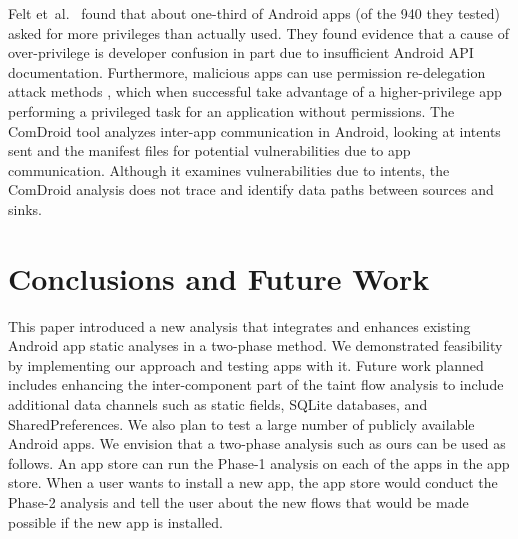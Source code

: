 {Felt et\ al.~\cite{felt2011android} found that about one-third of Android apps (of the 940 they tested) asked for more privileges than actually used. They found evidence that a cause of over-privilege is developer confusion in part due to insufficient Android API documentation. Furthermore, malicious apps can use permission re-delegation attack methods \cite{felt2011permission}, which when successful take advantage of a higher-privilege app performing a privileged task for an application without permissions. The ComDroid \cite{chin2011analyzing} tool analyzes inter-app communication in Android, looking at intents sent and the manifest files for potential vulnerabilities due to app communication. Although it examines vulnerabilities due to intents, the ComDroid analysis does not trace and identify data paths between sources and sinks.
\chapter{Conclusions and Future Work} \label{sec:conclusions} This
paper introduced a new analysis that integrates and enhances
existing Android app static analyses in a two-phase method.
We demonstrated feasibility by 
implementing our approach 
and testing apps with it. Future work planned includes enhancing the inter-component
part of the taint flow analysis to include additional data channels
such as static fields, SQLite databases, and SharedPreferences. 
We also plan to test a large number of publicly available Android apps.
We envision that a two-phase analysis such as ours can be used as follows.
An app store can run the Phase-1 analysis on each of the apps in the app store.
When a user wants to install a new app, the app store would conduct the Phase-2
analysis and tell the user about the new flows that would be made possible if
the new app is installed.

}
